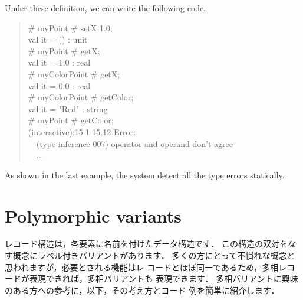 \documentclass{jbook}
\newcommand{\txt}[2]{#2}
\newcommand{\myem}{\mbox{\ \ }}
\begin{document}
	Under these definition, we can write the following code.
\begin{tt}\begin{quote}
\# myPoint \# setX 1.0;\\
val it = () : unit\\
\# myPoint \# getX;\\
val it = 1.0 : real\\
\# myColorPoint \# getX;\\
val it = 0.0 : real\\
\# myColorPoint \# getColor;\\
val it = "Red" : string\\
\# myPoint \# getColor;\\
(interactive):15.1-15.12 Error:\\
\myem  (type inference 007) operator and operand don't agree\\
\myem ...
\end{quote}\end{tt}
	As shown in the last example, the system detect all the type
errors statically.
\fi%

\section{\txt{多相バリアントの表現}{Polymorphic variants}}
\label{sec:extensionVariant}

\ifjp%
	レコード構造は，各要素に名前を付けたデータ構造です．
	この構造の双対をなす概念にラベル付きバリアントがあります．
	多くの方にとって不慣れな概念と思われますが，必要とされる機能はレ
コードとほぼ同一であるため，多相レコードが表現できれば，多相バリアントも
表現できます．
	多相バリアントに興味のある方への参考に，以下，その考え方とコード
例を簡単に紹介します．
\end{document}
